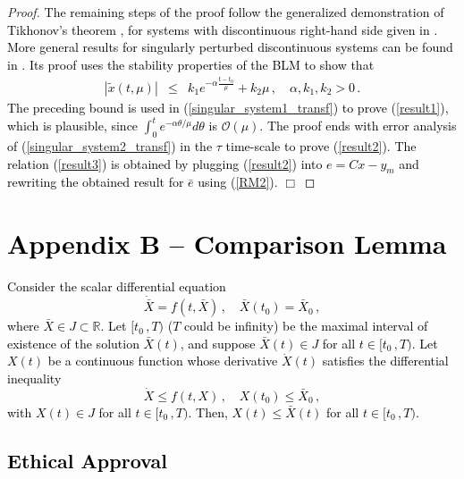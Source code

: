 \documentclass[review]{elsarticle}
\begin{document}
\begin{proof}
\textcolor{black}{
The remaining steps of the proof \textcolor{black}{follow} the generalized demonstration of Tikhonov's theorem \cite{K:2002}, \cite{KKO:1986} for systems with discontinuous right-hand side given in \cite[Chapter~5]{U:92}. More \textcolor{black}{general} results for singularly perturbed discontinuous systems can be 
found in \cite{F:2002}. Its proof uses the stability properties of the BLM to show that
%
\begin{eqnarray} \label{result4}
|\tilde{x}(t,\mu)| &\leq& k_1 e^{-\alpha\frac{t-t_0}{\mu}} + k_2 \mu \,, \quad \alpha, k_1, k_2>0\,.
\end{eqnarray}
%
The preceding bound is used in (\ref{singular_system1_transf}) to prove (\ref{result1}), which is plausible, since $\int_{0}^{t} e^{-\alpha \theta/\mu} d\theta$ is $\mathcal{O}(\mu)$. The proof ends with error analysis of (\ref{singular_system2_transf}) in the $\tau$ time-scale to prove (\ref{result2}). The relation (\ref{result3}) is obtained by plugging (\ref{result2}) \textcolor{black}{into $e=Cx-y_m$} and rewriting the obtained result for $\bar{e}$ using (\ref{RM2}). } \hfill $\Box$
%
\end{proof} 



\section*{
\textcolor{black}{Appendix B -- Comparison Lemma \cite{F:64}}} \label{AppendixB}

\textcolor{black}{
Consider the scalar differential equation
%
\begin{equation}
\dot{\bar{X}}=f(t,\bar{X})\,, \quad \bar{X}(t_0)=\bar{X}_0\,,
\end{equation}
%
where $\bar{X}\in J \subset \mathbb{R}$. Let $[t_0\,, T)$ ($T$ could be infinity) be the maximal interval of existence of the solution
$\bar{X}(t)$, and suppose $\bar{X}(t)\in J$ for all $t \in [t_0\,, T)$. Let $X(t)$ be a continuous function whose derivative $\dot{X}(t)$  satisfies the differential inequality 
%
\begin{equation}
\dot{X}\leq f(t,X)\,, \quad X(t_0)\leq\bar{X}_0\,,
\end{equation}
%
with $X(t) \in J$ for all $t\in[t_0\,, T)$. Then, $X(t)\leq\bar{X}(t)$ for all $t\in[t_0\,, T)$.
}




\textcolor{black}{
\section*{Ethical Approval}
}
\end{document}
